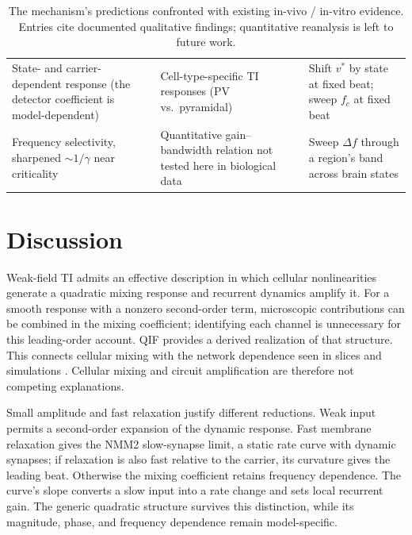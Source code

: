 \documentclass[11pt,a4paper]{article}
\begin{document}
\begin{table}[h]
\begin{tabular}{@{}>{\raggedright\arraybackslash}p{} >{\raggedright\arraybackslash}p{} >{\raggedright\arraybackslash}p{}@{}}
State- and carrier-dependent response (the detector coefficient is model-dependent) &
Cell-type-specific TI responses (PV vs.\ pyramidal) \cite{caldas2024} & Shift $v^*$ by
state at fixed beat; sweep $f_c$ at fixed beat \\
Frequency selectivity, sharpened $\sim1/\gamma$ near criticality & Quantitative
gain--bandwidth relation not tested here in biological data & Sweep $\Delta f$ through a region's band across brain
states \\
\bottomrule
\end{tabular}
\caption{The mechanism's predictions confronted with existing in-vivo / in-vitro evidence.
Entries cite documented qualitative findings; quantitative reanalysis is left to future
work.}\label{tab:predictions}
\end{table}

\section{Discussion}\label{sec:discussion}
Weak-field TI admits an effective description in which cellular nonlinearities
generate a quadratic mixing response and recurrent dynamics amplify it. For a
smooth response with a nonzero second-order term, microscopic contributions can
be combined in the mixing coefficient; identifying each channel is unnecessary
for this leading-order account. QIF provides a derived realization of that
structure. This connects cellular mixing \cite{mirzakhalili2020,luff2024mixer}
with the network dependence seen in slices and simulations
\cite{caldas2024,karimi2024,soroushi2025}. Cellular mixing and circuit amplification
are therefore not competing explanations.

Small amplitude and fast relaxation justify different reductions. Weak input
permits a second-order expansion of the dynamic response. Fast membrane
relaxation gives the NMM2 slow-synapse limit, a static rate curve with dynamic
synapses; if relaxation is also fast relative to the carrier, its curvature
gives the leading beat. Otherwise the mixing coefficient retains frequency
dependence. The curve's slope converts a slow input into a rate change and sets
local recurrent gain. The generic quadratic structure survives this distinction,
while its magnitude, phase, and frequency dependence remain model-specific.
\end{document}
